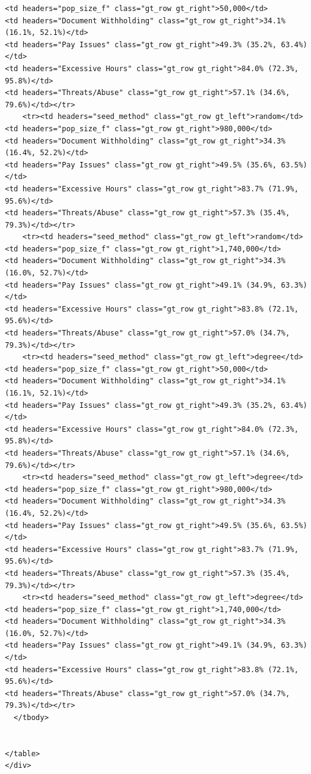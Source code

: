\documentclass[
  12pt,
  letterpaper,
  DIV=11,
  numbers=noendperiod]{scrartcl}
\theoremstyle{plain}
\theoremstyle{definition}
\begin{document}
\begin{table}
{\begin{verbatim}
<td headers="pop_size_f" class="gt_row gt_right">50,000</td>
<td headers="Document Withholding" class="gt_row gt_right">34.1% (16.1%, 52.1%)</td>
<td headers="Pay Issues" class="gt_row gt_right">49.3% (35.2%, 63.4%)</td>
<td headers="Excessive Hours" class="gt_row gt_right">84.0% (72.3%, 95.8%)</td>
<td headers="Threats/Abuse" class="gt_row gt_right">57.1% (34.6%, 79.6%)</td></tr>
    <tr><td headers="seed_method" class="gt_row gt_left">random</td>
<td headers="pop_size_f" class="gt_row gt_right">980,000</td>
<td headers="Document Withholding" class="gt_row gt_right">34.3% (16.4%, 52.2%)</td>
<td headers="Pay Issues" class="gt_row gt_right">49.5% (35.6%, 63.5%)</td>
<td headers="Excessive Hours" class="gt_row gt_right">83.7% (71.9%, 95.6%)</td>
<td headers="Threats/Abuse" class="gt_row gt_right">57.3% (35.4%, 79.3%)</td></tr>
    <tr><td headers="seed_method" class="gt_row gt_left">random</td>
<td headers="pop_size_f" class="gt_row gt_right">1,740,000</td>
<td headers="Document Withholding" class="gt_row gt_right">34.3% (16.0%, 52.7%)</td>
<td headers="Pay Issues" class="gt_row gt_right">49.1% (34.9%, 63.3%)</td>
<td headers="Excessive Hours" class="gt_row gt_right">83.8% (72.1%, 95.6%)</td>
<td headers="Threats/Abuse" class="gt_row gt_right">57.0% (34.7%, 79.3%)</td></tr>
    <tr><td headers="seed_method" class="gt_row gt_left">degree</td>
<td headers="pop_size_f" class="gt_row gt_right">50,000</td>
<td headers="Document Withholding" class="gt_row gt_right">34.1% (16.1%, 52.1%)</td>
<td headers="Pay Issues" class="gt_row gt_right">49.3% (35.2%, 63.4%)</td>
<td headers="Excessive Hours" class="gt_row gt_right">84.0% (72.3%, 95.8%)</td>
<td headers="Threats/Abuse" class="gt_row gt_right">57.1% (34.6%, 79.6%)</td></tr>
    <tr><td headers="seed_method" class="gt_row gt_left">degree</td>
<td headers="pop_size_f" class="gt_row gt_right">980,000</td>
<td headers="Document Withholding" class="gt_row gt_right">34.3% (16.4%, 52.2%)</td>
<td headers="Pay Issues" class="gt_row gt_right">49.5% (35.6%, 63.5%)</td>
<td headers="Excessive Hours" class="gt_row gt_right">83.7% (71.9%, 95.6%)</td>
<td headers="Threats/Abuse" class="gt_row gt_right">57.3% (35.4%, 79.3%)</td></tr>
    <tr><td headers="seed_method" class="gt_row gt_left">degree</td>
<td headers="pop_size_f" class="gt_row gt_right">1,740,000</td>
<td headers="Document Withholding" class="gt_row gt_right">34.3% (16.0%, 52.7%)</td>
<td headers="Pay Issues" class="gt_row gt_right">49.1% (34.9%, 63.3%)</td>
<td headers="Excessive Hours" class="gt_row gt_right">83.8% (72.1%, 95.6%)</td>
<td headers="Threats/Abuse" class="gt_row gt_right">57.0% (34.7%, 79.3%)</td></tr>
  </tbody>
  
  
</table>
</div>
\end{verbatim}

}

\end{table}%
\end{document}
